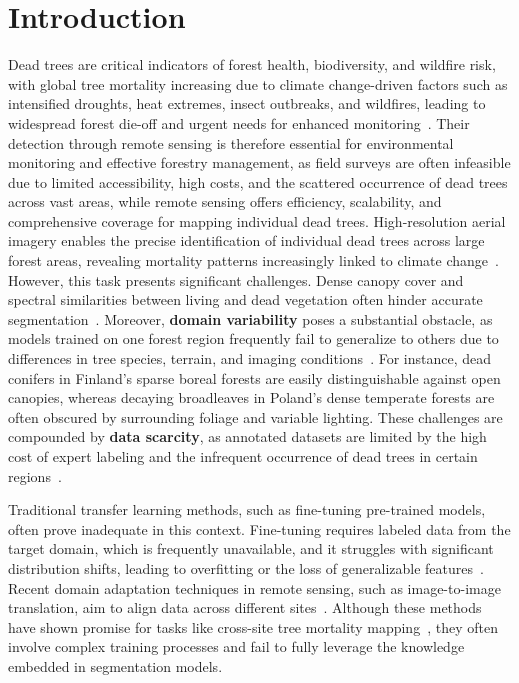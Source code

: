 \documentclass[twocolumn]{article}
\begin{document}

\section{Introduction}
\label{sec:intro}

Dead trees are critical indicators of forest health, biodiversity, and wildfire risk, with global tree mortality increasing due to climate change-driven factors such as intensified droughts, heat extremes, insect outbreaks, and wildfires, leading to widespread forest die-off and urgent needs for enhanced monitoring~\citep{junttila2024significant,cheng2024scattered,international2025towards}. Their detection through remote sensing is therefore essential for environmental monitoring and effective forestry management, as field surveys are often infeasible due to limited accessibility, high costs, and the scattered occurrence of dead trees across vast areas, while remote sensing offers efficiency, scalability, and comprehensive coverage for mapping individual dead trees. High-resolution aerial imagery enables the precise identification of individual dead trees across large forest areas, revealing mortality patterns increasingly linked to climate change~\citep{ahishali2025ada}. However, this task presents significant challenges. Dense canopy cover and spectral similarities between living and dead vegetation often hinder accurate segmentation~\citep{briechle2021silvi}. Moreover, \textbf{domain variability} poses a substantial obstacle, as models trained on one forest region frequently fail to generalize to others due to differences in tree species, terrain, and imaging conditions~\citep{angarano2024domain}. For instance, dead conifers in Finland's sparse boreal forests are easily distinguishable against open canopies, whereas decaying broadleaves in Poland's dense temperate forests are often obscured by surrounding foliage and variable lighting. These challenges are compounded by \textbf{data scarcity}, as annotated datasets are limited by the high cost of expert labeling and the infrequent occurrence of dead trees in certain regions~\citep{kellenberger2018detecting, liu2019knowledge}.

Traditional transfer learning methods, such as fine-tuning pre-trained models, often prove inadequate in this context. Fine-tuning requires labeled data from the target domain, which is frequently unavailable, and it struggles with significant distribution shifts, leading to overfitting or the loss of generalizable features~\citep{tuia2016domain}. Recent domain adaptation techniques in remote sensing, such as image-to-image translation, aim to align data across different sites~\citep{wang2019domain, ahishali2025ada}. Although these methods have shown promise for tasks like cross-site tree mortality mapping~\citep{chen2022object, dalponte2019individual}, they often involve complex training processes and fail to fully leverage the knowledge embedded in segmentation models.
\end{document}
